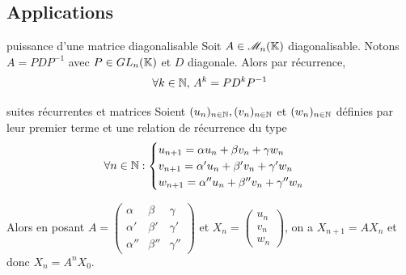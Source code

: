 \subsection{Applications }

\begin{proposition}{puissance d'une matrice diagonalisable}{}
    Soit $A \in \mathscr M_n(\mathbb{K})$ diagonalisable. Notons $A = PDP^{-1}$ avec $P \in GL_n(\mathbb{K})$ et $D$ diagonale.
    Alors par récurrence, $$\forall k \in \mathbb{N}, \, A^k = P D^k P^{-1}$$
\end{proposition}

\begin{proposition}{suites récurrentes et matrices}{}
    Soient $(u_n)_{n \in \mathbb{N}}, (v_n)_{n \in \mathbb{N}}$ et $(w_n)_{n \in \mathbb{N}}$ définies par leur 
    premier terme et une relation de récurrence du type 
    $$\forall n \in \mathbb{N} : \begin{cases}
        u_{n + 1} = \alpha u_n + \beta v_n + \gamma w_n \\
        v_{n + 1} = \alpha' u_n + \beta' v_n + \gamma' w_n \\
        w_{n + 1} = \alpha'' u_n + \beta'' v_n + \gamma'' w_n
    \end{cases}$$

    Alors en posant $A = \begin{pmatrix}
        \alpha & \beta & \gamma \\
        \alpha' & \beta' & \gamma' \\
        \alpha'' & \beta'' & \gamma''
    \end{pmatrix}$ et $X_n = \begin{pmatrix}
        u_n \\
        v_n \\
        w_n
    \end{pmatrix}$, on a $X_{n + 1} = A X_n$ et donc $X_n = A^n X_0$.
\end{proposition}


